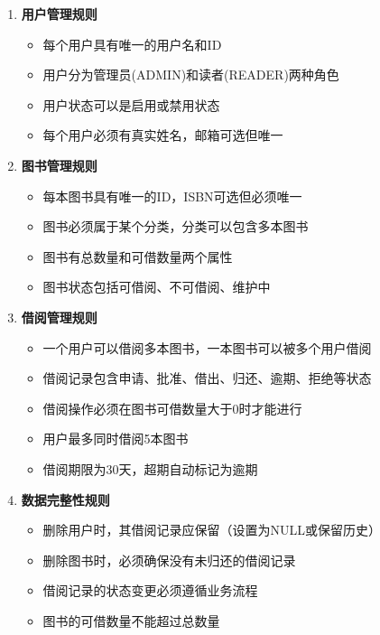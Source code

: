 \documentclass[12pt,a4paper]{article}
\begin{document}
\begin{enumerate}
    \item \textbf{用户管理规则}
    \begin{itemize}
        \item 每个用户具有唯一的用户名和ID
        \item 用户分为管理员(ADMIN)和读者(READER)两种角色
        \item 用户状态可以是启用或禁用状态
        \item 每个用户必须有真实姓名，邮箱可选但唯一
    \end{itemize}
    
    \item \textbf{图书管理规则}
    \begin{itemize}
        \item 每本图书具有唯一的ID，ISBN可选但必须唯一
        \item 图书必须属于某个分类，分类可以包含多本图书
        \item 图书有总数量和可借数量两个属性
        \item 图书状态包括可借阅、不可借阅、维护中
    \end{itemize}
    
    \item \textbf{借阅管理规则}
    \begin{itemize}
        \item 一个用户可以借阅多本图书，一本图书可以被多个用户借阅
        \item 借阅记录包含申请、批准、借出、归还、逾期、拒绝等状态
        \item 借阅操作必须在图书可借数量大于0时才能进行
        \item 用户最多同时借阅5本图书
        \item 借阅期限为30天，超期自动标记为逾期
    \end{itemize}
    
    \item \textbf{数据完整性规则}
    \begin{itemize}
        \item 删除用户时，其借阅记录应保留（设置为NULL或保留历史）
        \item 删除图书时，必须确保没有未归还的借阅记录
        \item 借阅记录的状态变更必须遵循业务流程
        \item 图书的可借数量不能超过总数量
    \end{itemize}
\end{enumerate}
\end{document}
